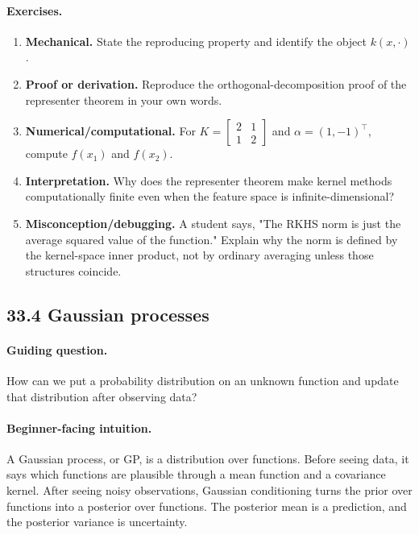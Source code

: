 \paragraph{Exercises.}
\begin{enumerate}[label=\textbf{33.3.\arabic*.}, leftmargin=*]
\item \textbf{Mechanical.} State the reproducing property and identify the object \(k(x,\cdot)\).
\item \textbf{Proof or derivation.} Reproduce the orthogonal-decomposition proof of the representer theorem in your own words.
\item \textbf{Numerical/computational.} For \(K=\begin{bmatrix}2&1\\1&2\end{bmatrix}\) and \(\alpha=(1,-1)^\top\), compute \(f(x_1)\) and \(f(x_2)\).
\item \textbf{Interpretation.} Why does the representer theorem make kernel methods computationally finite even when the feature space is infinite-dimensional?
\item \textbf{Misconception/debugging.} A student says, "The RKHS norm is just the average squared value of the function." Explain why the norm is defined by the kernel-space inner product, not by ordinary averaging unless those structures coincide.
\end{enumerate}

\subsection{33.4 Gaussian processes}

\paragraph{Guiding question.}
How can we put a probability distribution on an unknown function and update that distribution after observing data?

\paragraph{Beginner-facing intuition.}
A Gaussian process, or GP, is a distribution over functions. Before seeing data, it says which functions are plausible through a mean function and a covariance kernel. After seeing noisy observations, Gaussian conditioning turns the prior over functions into a posterior over functions. The posterior mean is a prediction, and the posterior variance is uncertainty.

